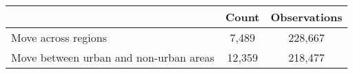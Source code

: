 {
\def\sym#1{\ifmmode^{#1}\else\(^{#1}\)\fi}
\begin{tabular*}{\textwidth}{@{\hskip\tabcolsep\extracolsep\fill}l*{1}{cc}}
\toprule
                    &       Count&Observations\\
\midrule
Move across regions &       7,489&     228,667\\
Move between urban and non-urban areas&      12,359&     218,477\\
\bottomrule
\end{tabular*}
}
